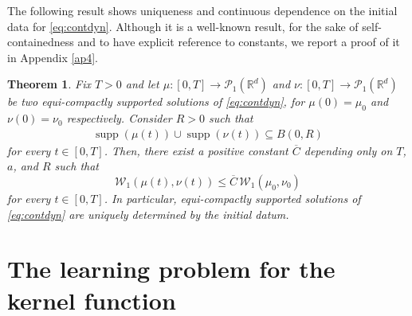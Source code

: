 \documentclass[A4paper,11pt]{article}
\newtheorem{theorem}{Theorem}[section]
\newtheorem{lemma}[theorem]{Lemma}
\theoremstyle{definition}
\newcommand{\R}{\mathbb{R}}
\newcommand{\W}{\mathcal{W}}
\newcommand{\PP}{\mathcal{P}_1}
\DeclareMathOperator{\supp}{supp}
\begin{document}


%


The following result shows uniqueness and continuous dependence on the initial data for \eqref{eq:contdyn}. Although it is a well-known result, for the sake of self-containedness and to have explicit reference to constants, we report a proof of it in Appendix \ref{ap4}.

\begin{theorem}\label{uniq}
Fix $T>0$  and let $\mu:[0,T]\rightarrow\mathcal{P}_1(\R^d)$ and $\nu:[0,T]\rightarrow\mathcal{P}_1(\R^d)$ be two equi-compactly supported solutions  of \eqref{eq:contdyn}, for $\mu(0)=\mu_0$ and $\nu(0)=\nu_0$ respectively. Consider $R>0$ such that
\begin{align}\label{supptot}
\supp(\mu(t))\cup\supp(\nu(t)) \subseteq B(0, R)
\end{align}
for every $t \in[0, T]$. Then, there exist a positive constant $\overline{C}$ depending only on $T$, $a$,  and $R$ such that
\begin{equation}\label{stab}
\W_1(\mu(t), \nu(t)) \le \overline{C} \, \W_1(\mu_0, \nu_0)
\end{equation}
for every $t \in [0, T]$. In particular, equi-compactly supported solutions of \eqref{eq:contdyn} are uniquely determined by the initial datum.
\end{theorem}



\section{The learning problem for the kernel function}\label{sec:learn}
\end{document}
